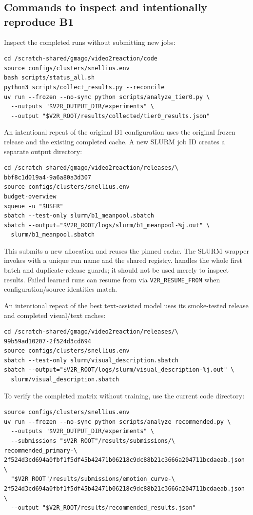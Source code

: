 \documentclass[11pt,a4paper]{article}
\newcommand{\code}[1]{\texttt{#1}}
\begin{document}
\subsection{Commands to inspect and intentionally reproduce B1}
Inspect the completed runs without submitting new jobs:
\begin{verbatim}
cd /scratch-shared/gmago/video2reaction/code
source configs/clusters/snellius.env
bash scripts/status_all.sh
python3 scripts/collect_results.py --reconcile
uv run --frozen --no-sync python scripts/analyze_tier0.py \
  --outputs "$V2R_OUTPUT_DIR/experiments" \
  --output "$V2R_ROOT/results/collected/tier0_results.json"
\end{verbatim}
An intentional repeat of the original B1 configuration uses the original frozen release and the existing completed cache. A new SLURM job ID creates a separate output directory:
\begin{verbatim}
cd /scratch-shared/gmago/video2reaction/releases/\
bbf8c1d019a4-9a6a80a3d307
source configs/clusters/snellius.env
budget-overview
squeue -u "$USER"
sbatch --test-only slurm/b1_meanpool.sbatch
sbatch --output="$V2R_ROOT/logs/slurm/b1_meanpool-%j.out" \
  slurm/b1_meanpool.sbatch
\end{verbatim}
This submits a new allocation and reuses the pinned cache. The SLURM wrapper invokes  with a unique run name and the shared registry.  handles the whole first batch and duplicate-release guards; it should not be used merely to inspect results. Failed learned runs can resume from  via \code{V2R\_RESUME\_FROM} when configuration/source identities match.

An intentional repeat of the best text-assisted model uses its smoke-tested release and completed visual/text caches:
\begin{verbatim}
cd /scratch-shared/gmago/video2reaction/releases/\
99b59ad10207-2f524d3cd694
source configs/clusters/snellius.env
sbatch --test-only slurm/visual_description.sbatch
sbatch --output="$V2R_ROOT/logs/slurm/visual_description-%j.out" \
  slurm/visual_description.sbatch
\end{verbatim}
\Needspace{16\baselineskip}
To verify the completed matrix without training, use the current code directory:
\begin{verbatim}
source configs/clusters/snellius.env
uv run --frozen --no-sync python scripts/analyze_recommended.py \
  --outputs "$V2R_OUTPUT_DIR/experiments" \
  --submissions "$V2R_ROOT"/results/submissions/\
recommended_primary-\
2f524d3cd694a0fbf1f5df45b42471b06218c9dc88b21c3666a204711bcdaeab.json \
  "$V2R_ROOT"/results/submissions/emotion_curve-\
2f524d3cd694a0fbf1f5df45b42471b06218c9dc88b21c3666a204711bcdaeab.json \
  --output "$V2R_ROOT/results/recommended_results.json"
\end{verbatim}
\end{document}
